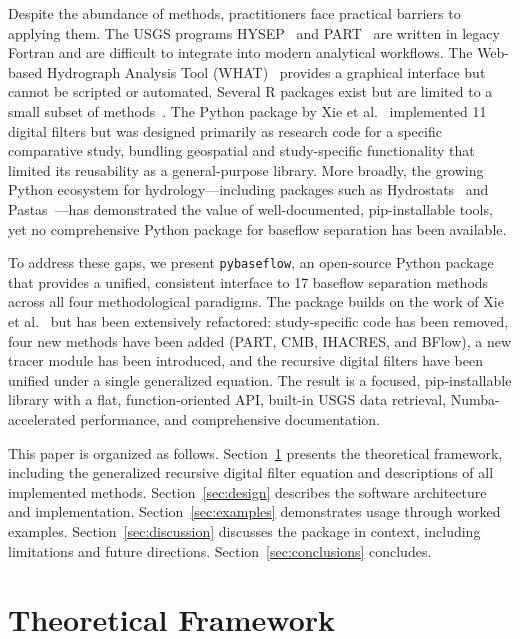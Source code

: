 \documentclass[hydrology,article,submit,pdftex,moreauthors]{Definitions/mdpi}
\begin{document}
Despite the abundance of methods, practitioners face practical barriers to applying them. The USGS programs HYSEP~\cite{Sloto1996} and PART~\cite{Rutledge1998} are written in legacy Fortran and are difficult to integrate into modern analytical workflows. The Web-based Hydrograph Analysis Tool (WHAT)~\cite{Lim2005} provides a graphical interface but cannot be scripted or automated. Several R packages exist but are limited to a small subset of methods~\cite{Pelletier2020}. The Python package by Xie et al.~\cite{Xie2020} implemented 11 digital filters but was designed primarily as research code for a specific comparative study, bundling geospatial and study-specific functionality that limited its reusability as a general-purpose library. More broadly, the growing Python ecosystem for hydrology---including packages such as Hydrostats~\cite{Roberts2018} and Pastas~\cite{Collenteur2019}---has demonstrated the value of well-documented, pip-installable tools, yet no comprehensive Python package for baseflow separation has been available.

To address these gaps, we present \texttt{pybaseflow}, an open-source Python package that provides a unified, consistent interface to 17 baseflow separation methods across all four methodological paradigms. The package builds on the work of Xie et al.~\cite{Xie2020} but has been extensively refactored: study-specific code has been removed, four new methods have been added (PART, CMB, IHACRES, and BFlow), a new tracer module has been introduced, and the recursive digital filters have been unified under a single generalized equation. The result is a focused, pip-installable library with a flat, function-oriented API, built-in USGS data retrieval, Numba-accelerated performance, and comprehensive documentation.

This paper is organized as follows. Section~\ref{sec:framework} presents the theoretical framework, including the generalized recursive digital filter equation and descriptions of all implemented methods. Section~\ref{sec:design} describes the software architecture and implementation. Section~\ref{sec:examples} demonstrates usage through worked examples. Section~\ref{sec:discussion} discusses the package in context, including limitations and future directions. Section~\ref{sec:conclusions} concludes.

\section{Theoretical Framework}
\label{sec:framework}
\end{document}
